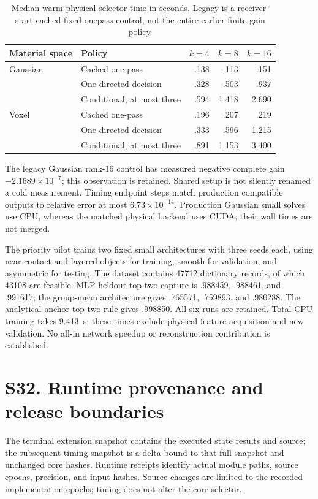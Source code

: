 \begin{table}[htbp]\centering\caption{Median warm physical selector time in seconds. Legacy is a receiver-start cached fixed-onepass control, not the entire earlier finite-gain policy.}\label{tab:exchange-time-supp}
\begin{tabular}{@{}llrrr@{}}\toprule
Material space&Policy&$k=4$&$k=8$&$k=16$\\\midrule
Gaussian&Cached one-pass&.138&.113&.151\\
&One directed decision&.328&.503&.937\\
&Conditional, at most three&.594&1.418&2.690\\
Voxel&Cached one-pass&.196&.207&.219\\
&One directed decision&.333&.596&1.215\\
&Conditional, at most three&.891&1.153&3.400\\\bottomrule
\end{tabular}\end{table}
The legacy Gaussian rank-16 control has measured negative complete gain $-2.1689\times10^{-7}$; this observation is retained. Shared setup is not silently renamed a cold measurement. Timing endpoint steps match production compatible outputs to relative error at most $6.73\times10^{-14}$. Production Gaussian small solves use CPU, whereas the matched physical backend uses CUDA; their wall times are not merged.

The priority pilot trains two fixed small architectures with three seeds each, using near-contact and layered objects for training, smooth for validation, and asymmetric for testing. The dataset contains 47712 dictionary records, of which 43108 are feasible. MLP heldout top-two capture is .988459, .988461, and .991617; the group-mean architecture gives .765571, .759893, and .980288. The analytical anchor top-two rule gives .998850. All six runs are retained. Total CPU training takes 9.413~s; these times exclude physical feature acquisition and new validation. No all-in network speedup or reconstruction contribution is established.

\section*{S32. Runtime provenance and release boundaries}
The terminal extension snapshot contains the executed state results and source; the subsequent timing snapshot is a delta bound to that full snapshot and unchanged core hashes. Runtime receipts identify actual module paths, source epochs, precision, and input hashes. Source changes are limited to the recorded implementation epochs; timing does not alter the core selector.

